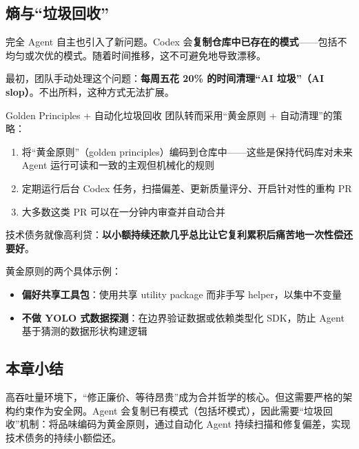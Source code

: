 \subsection{熵与``垃圾回收''}

完全 Agent 自主也引入了新问题。Codex 会\textbf{复制仓库中已存在的模式}——包括不均匀或次优的模式。随着时间推移，这不可避免地导致漂移。

最初，团队手动处理这个问题：\textbf{每周五花 20\% 的时间清理``AI 垃圾''（AI slop）}。不出所料，这种方式无法扩展。

\begin{importantbox}{Golden Principles + 自动化垃圾回收}
团队转而采用``黄金原则 + 自动清理''的策略：
\begin{enumerate}[nosep]
  \item 将``黄金原则''（golden principles）编码到仓库中——这些是保持代码库对未来 Agent 运行可读和一致的主观但机械化的规则
  \item 定期运行后台 Codex 任务，扫描偏差、更新质量评分、开启针对性的重构 PR
  \item 大多数这类 PR 可以在一分钟内审查并自动合并
\end{enumerate}
技术债务就像高利贷：\textbf{以小额持续还款几乎总比让它复利累积后痛苦地一次性偿还要好}。
\end{importantbox}

黄金原则的两个具体示例：
\begin{itemize}[nosep]
  \item \textbf{偏好共享工具包}：使用共享 utility package 而非手写 helper，以集中不变量
  \item \textbf{不做 YOLO 式数据探测}：在边界验证数据或依赖类型化 SDK，防止 Agent 基于猜测的数据形状构建逻辑
\end{itemize}

\subsection{本章小结}

高吞吐量环境下，``修正廉价、等待昂贵''成为合并哲学的核心。但这需要严格的架构约束作为安全网。Agent 会复制已有模式（包括坏模式），因此需要``垃圾回收''机制：将品味编码为黄金原则，通过自动化 Agent 持续扫描和修复偏差，实现技术债务的持续小额偿还。

\newpage

